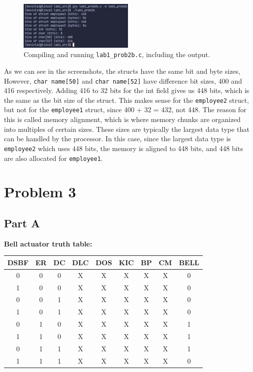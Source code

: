 \documentclass{article}
\begin{document}
\begin{figure}[H]
    \centering
    \includegraphics[width=0.5\textwidth]{./images/prob2partb2.png}
    \caption{Compiling and running \lstinline!lab1_prob2b.c!, including the output.}
\end{figure}

As we can see in the screenshots, the structs have the same bit and byte sizes,
However, \lstinline!char name[50]! and \lstinline!char name[52]! have difference bit sizes, 400 and 416 respectively.
Adding 416 to 32 bits for the int field gives us 448 bits, which is the same as the bit size of the struct.
This makes sense for the \lstinline!employee2! struct, but not for the \lstinline!employee1! struct, since 400 + 32 = 432, not 448.
The reason for this is called memory alignment, which is where memory chunks are organized into multiples of certain sizes.
These sizes are typically the largest data type that can be handled by the processor.
In this case, since the largest data type is \lstinline!employee2! which uses 448 bits, the memory is aligned to 448 bits, and 448 bits are also allocated for \lstinline!employee1!.

\newpage
\section{Problem 3}

\subsection{Part A}
\textbf{Bell actuator truth table:}
\\
\begin{tabular} {c c c c c c c c | c}
    \hline
    DSBF & ER & DC & DLC & DOS & KIC & BP & CM & BELL \\
    \hline
    0 & 0 & 0 & X & X & X & X & X & 0 \\
    1 & 0 & 0 & X & X & X & X & X & 0 \\
    0 & 0 & 1 & X & X & X & X & X & 0 \\
    1 & 0 & 1 & X & X & X & X & X & 0 \\
    0 & 1 & 0 & X & X & X & X & X & 1 \\
    1 & 1 & 0 & X & X & X & X & X & 1 \\
    0 & 1 & 1 & X & X & X & X & X & 1 \\
    1 & 1 & 1 & X & X & X & X & X & 0 \\
\end{tabular}
\\
\end{document}
